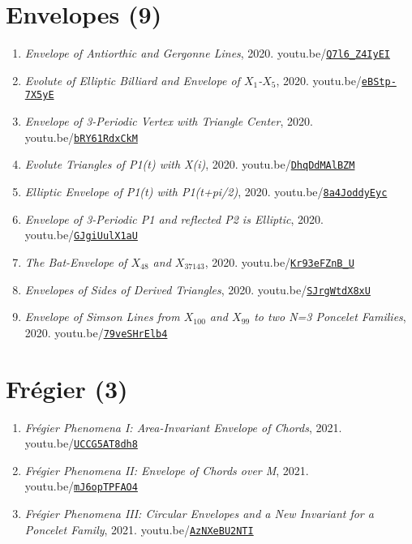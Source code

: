 \documentclass[12pt]{article}
\begin{document}
\section{Envelopes (9)}

\begin{enumerate}[resume]
\item \textit{Envelope of Antiorthic and Gergonne Lines}, 2020. youtu.be/\href{https://youtu.be/Q7l6_Z4IyEI}{\nolinkurl{Q7l6\_Z4IyEI}}
\item \textit{Evolute of Elliptic Billiard and Envelope of $X_{1}$-$X_{5}$}, 2020. youtu.be/\href{https://youtu.be/eBStp-7X5yE}{\nolinkurl{eBStp-7X5yE}}
\item \textit{Envelope of 3-Periodic Vertex with Triangle Center}, 2020. youtu.be/\href{https://youtu.be/bRY61RdxCkM}{\nolinkurl{bRY61RdxCkM}}
\item \textit{Evolute Triangles of P1(t) with X(i)}, 2020. youtu.be/\href{https://youtu.be/DhqDdMAlBZM}{\nolinkurl{DhqDdMAlBZM}}
\item \textit{Elliptic Envelope of P1(t) with P1(t+pi/2)}, 2020. youtu.be/\href{https://youtu.be/8a4JoddyEyc}{\nolinkurl{8a4JoddyEyc}}
\item \textit{Envelope of 3-Periodic P1 and reflected P2 is Elliptic}, 2020. youtu.be/\href{https://youtu.be/GJgiUulX1aU}{\nolinkurl{GJgiUulX1aU}}
\item \textit{The Bat-Envelope of $X_{48}$ and $X_{37143}$}, 2020. youtu.be/\href{https://youtu.be/Kr93eFZnB_U}{\nolinkurl{Kr93eFZnB\_U}}
\item \textit{Envelopes of Sides of Derived Triangles}, 2020. youtu.be/\href{https://youtu.be/SJrgWtdX8xU}{\nolinkurl{SJrgWtdX8xU}}
\item \textit{Envelope of Simson Lines from $X_{100}$ and $X_{99}$ to two N=3 Poncelet Families}, 2020. youtu.be/\href{https://youtu.be/79veSHrElb4}{\nolinkurl{79veSHrElb4}}
\end{enumerate}

\section{Frégier (3)}

\begin{enumerate}[resume]
\item \textit{Frégier Phenomena I: Area-Invariant Envelope of Chords}, 2021. youtu.be/\href{https://youtu.be/UCCG5AT8dh8}{\nolinkurl{UCCG5AT8dh8}}
\item \textit{Frégier Phenomena II: Envelope of Chords over M}, 2021. youtu.be/\href{https://youtu.be/mJ6opTPFAO4}{\nolinkurl{mJ6opTPFAO4}}
\item \textit{Frégier Phenomena III: Circular Envelopes and a New Invariant for a Poncelet Family}, 2021. youtu.be/\href{https://youtu.be/AzNXeBU2NTI}{\nolinkurl{AzNXeBU2NTI}}
\end{enumerate}
\end{document}
